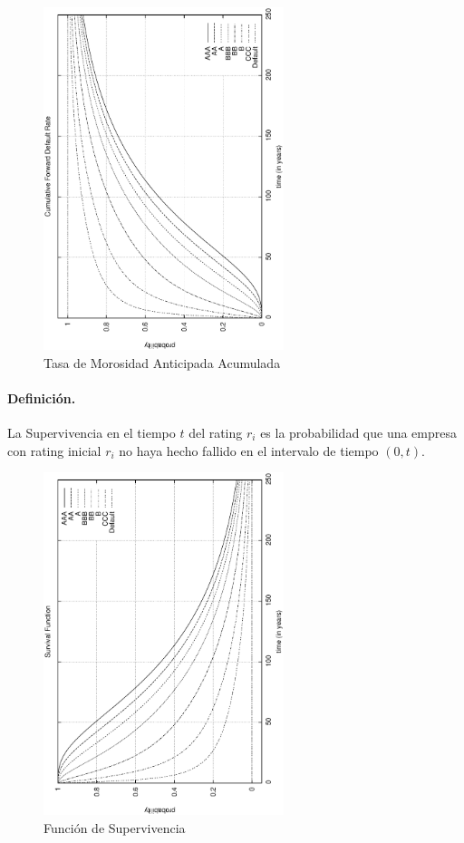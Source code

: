 \begin{figure}[!hb]
\begin{center}
\includegraphics[height=10cm, angle=-90]{./images/tmaa.ps}
\caption{Tasa de Morosidad Anticipada Acumulada}
\label{tmaa}
\end{center}
\end{figure}

\paragraph{Definici\'on.} La Supervivencia en el tiempo $t$ del rating $r_i$ 
es la probabilidad que una empresa con rating inicial $r_i$ no haya hecho 
fallido en el intervalo de tiempo $(0,t)$.

\begin{figure}[!hb]
\begin{center}
\includegraphics[height=10cm, angle=-90]{./images/survival.ps}
\caption{Funci\'on de Supervivencia}
\label{survival}
\end{center}
\end{figure}

